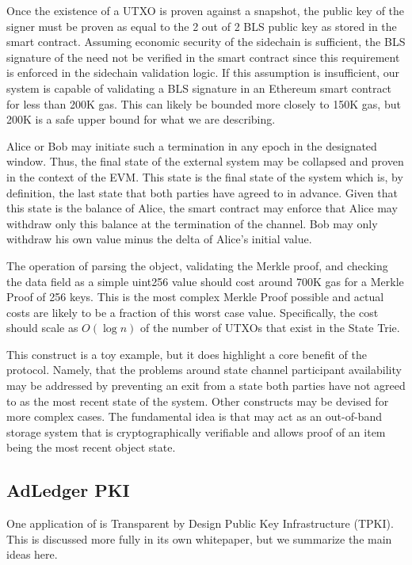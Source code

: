 Once the existence of a UTXO is proven against a snapshot, the public
key of the signer must be proven as equal to the 2 out of 2 BLS public
key as stored in the smart contract.
Assuming economic security of the sidechain is sufficient, the BLS
signature of the \DataStore{} need not be verified in the smart contract
since this requirement is enforced in the sidechain validation logic.
If this assumption is insufficient, our system is capable of validating
a BLS signature in an Ethereum smart contract for less than 200K gas.
This can likely be bounded more closely to 150K gas, but 200K is a safe
upper bound for what we are describing.

Alice or Bob may initiate such a termination in any epoch in the
designated window.
Thus, the final state of the external system may be collapsed and
proven in the context of the EVM.
This state is the final state of the system which is, by definition,
the last state that both parties have agreed to in advance.
Given that this state is the balance of Alice, the smart contract may
enforce that Alice may withdraw only this balance at the termination of
the channel.
Bob may only withdraw his own value minus the delta of Alice’s initial
value.

The operation of parsing the object, validating the Merkle proof, and
checking the data field as a simple uint256 value should cost around
700K gas for a Merkle Proof of 256 keys.
This is the most complex Merkle Proof possible and actual costs are
likely to be a fraction of this worst case value.
Specifically, the cost should scale as $O(\log n)$ of the number of UTXOs
that exist in the State Trie.

This construct is a toy example, but it does highlight a core benefit
of the protocol.
Namely, that the problems around state channel participant availability
may be addressed by preventing an exit from a state both parties have
not agreed to as the most recent state of the system.
Other constructs may be devised for more complex cases.
The fundamental idea is that \LayerTwo{} may act as an out-of-band
storage system that is cryptographically verifiable and allows proof of
an item being the most recent object state.

\subsection{AdLedger PKI}

One application of \LayerTwo{} is Transparent by Design Public Key
Infrastructure (TPKI).
This is discussed more fully in its own whitepaper, but we summarize
the main ideas here.

